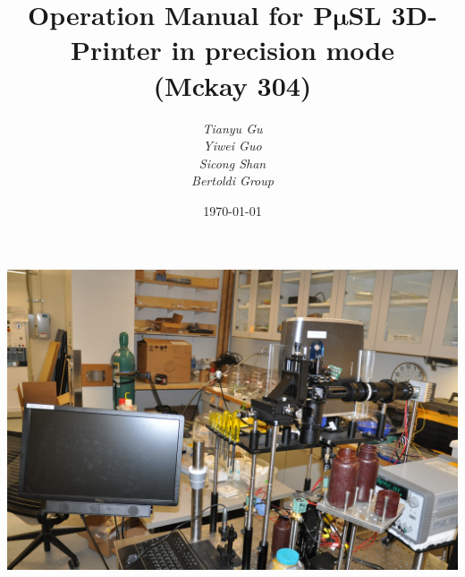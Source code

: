 \documentclass[a4paper]{article}
\title{\textbf{
	     \huge{Operation Manual for}
	       \vspace{10pt}
	         \Huge{P$\bm{\mu}$SL 3D-Printer
	             in precision mode}\\ %
	             \vspace{10pt}
	              \Large{(Mckay 304)}	
	               \vspace{20pt}
	                 }}
\author{\textit{Tianyu Gu} \\
 		  \textit{Yiwei Guo}\\
 		    \textit{Sicong Shan}\\
 		      \textit{Bertoldi Group}}
\date{\today}
\begin{document}
 
    \maketitle
    \vspace{50pt}
    \centering
	\includegraphics[width=400pt]{mainoverview.JPG}
    \pagebreak
    
    \tableofcontents
    \pagebreak
    
\raggedright
\end{document}
